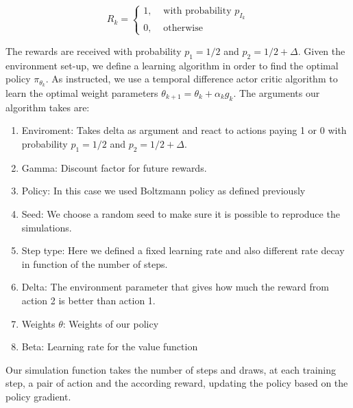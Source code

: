 \documentclass[a4paper, 11pt]{article} %
\begin{document}
$$
R_{k}=\left\{\begin{array}{ll}{1,} & {\text { with probability } p_{I_{k}}} \\ {0,} & {\text { otherwise }}\end{array}\right.
$$

The rewards are received with probability $p_{1}=1 / 2$ and $p_{2}=1 / 2+\Delta$. Given the environment set-up, we define a learning algorithm in order to find the optimal policy $\pi_{\theta_{k}}$. As instructed, we use a temporal difference actor critic algorithm to learn the optimal weight parameters $\theta_{k+1}=\theta_{k}+\alpha_{k} g_{k}$. The arguments our algorithm takes are:

\begin{enumerate}
	\item Enviroment: Takes delta as argument and react to actions paying 1 or 0 with probability $p_{1}=1 / 2$ and $p_{2}=1 / 2+\Delta$.
	\item Gamma: Discount factor for future rewards.
	\item Policy: In this case we used Boltzmann policy as defined previously
	\item Seed: We choose a random seed to make sure it is possible to reproduce the simulations.
	\item Step type: Here we defined a fixed learning rate and also different rate decay in function of the number of steps.
	\item Delta: The environment parameter that gives how much the reward from action 2 is better than action 1.
	\item Weights $\theta$: Weights of our policy
	\item Beta: Learning rate for the value function
\end{enumerate}

Our simulation function takes the number of steps and draws, at each training step, a pair of action and the according reward, updating the policy based on the policy gradient.
\end{document}
